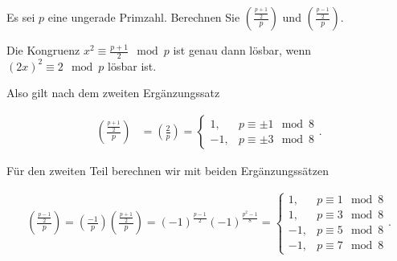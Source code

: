
\begin{exercise}

Es sei $p$ eine ungerade Primzahl. Berechnen Sie $\left( \frac{\frac{p+1}{2}}{p} \right)$
und $\left(\frac{\frac{p-1}{2}}{p}\right)$.

\end{exercise}


\begin{solution}

Die Kongruenz $x^2 \equiv \frac{p+1}{2} \mod{p}$ ist genau dann
lösbar, wenn $(2x)^2 \equiv 2 \mod{p}$ lösbar ist. 

Also gilt nach dem zweiten Ergänzungssatz

\begin{align*}
    \left( \frac{\frac{p+1}{2}}{p} \right)
    &= \left(\frac{2}{p}\right)
    = \begin{cases}
        1, & p \equiv \pm 1 \mod{8} \\
        -1, & p \equiv \pm 3 \mod{8}
    \end{cases}.
\end{align*}

Für den zweiten Teil berechnen wir mit beiden Ergänzungssätzen

\begin{align*}
    \left(\frac{\frac{p-1}{2}}{p}\right) =
    \left(\frac{-1}{p}\right)\left( \frac{\frac{p+1}{2}}{p} \right) =
    (-1)^{\frac{p-1}{2}}(-1)^{\frac{p^2-1}{8}}
    = \begin{cases}
        1, & p \equiv 1 \mod{8} \\
        1, & p \equiv 3 \mod{8} \\
        -1, & p \equiv 5 \mod{8} \\
        -1, & p \equiv 7 \mod{8}
    \end{cases}.
\end{align*}

\end{solution}

